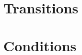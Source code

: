 \documentclass[10pt, compress]{beamer}
\begin{document}

\section{Transitions}

\section{Conditions}
\end{document}
